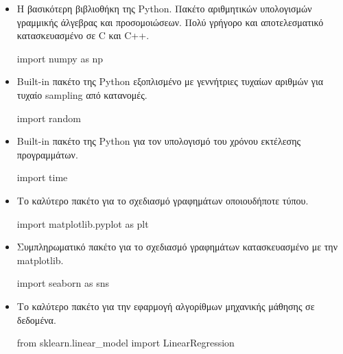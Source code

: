\begin{itemize}
\item Η βασικότερη βιβλιοθήκη της {\en Python}. Πακέτο αριθμητικών υπολογισμών γραμμικής άλγεβρας και προσομοιώσεων. Πολύ γρήγορο και αποτελεσματικό κατασκευασμένο σε {\en C} και {\en C++}.
{\en
\begin{python}
import numpy as np
\end{python}
}
\newpage
\item {\en Built-in} πακέτο της {\en Python} εξοπλισμένο με γεννήτριες τυχαίων αριθμών για τυχαίο {\en sampling} από κατανομές.
{\en
\begin{python}
import random
\end{python}
}
\item {\en Built-in} πακέτο της {\en Python} για τον υπολογισμό του χρόνου εκτέλεσης προγραμμάτων.
{\en
\begin{python}
import time
\end{python}
}
\item Το καλύτερο πακέτο για το σχεδιασμό γραφημάτων οποιουδήποτε τύπου.
{\en
\begin{python}
import matplotlib.pyplot as plt
\end{python}
}
\item Συμπληρωματικό πακέτο για το σχεδιασμό γραφημάτων κατασκευασμένο με την {\en matplotlib}.
{\en
\begin{python}
import seaborn as sns
\end{python}
}
\item Το καλύτερο πακέτο για την εφαρμογή αλγορίθμων μηχανικής μάθησης σε δεδομένα. 
{\en
\begin{python}
from sklearn.linear_model import LinearRegression
\end{python}
}
\end{itemize}
